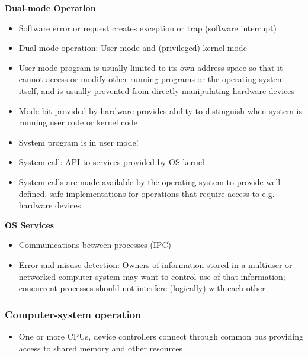 \documentclass[a4paper]{article}
\begin{document}
\textbf{Dual-mode Operation}
\begin{itemize}
	\item Software error or request creates exception or trap (software interrupt)
	\item Dual-mode operation: User mode and (privileged) kernel mode
	\item User-mode program is usually limited to its own address space so that it cannot access or modify other running programs or the operating system itself, and is usually prevented from directly manipulating hardware devices
	\item Mode bit provided by hardware provides ability to distinguish when system is running user code or kernel code
	\item System program is in user mode!
	\item System call: API to services provided by OS kernel
	\item System calls are made available by the operating system to provide well-defined, safe implementations for operations that require access to e.g. hardware devices
\end{itemize}
\newpage
\noindent \textbf{OS Services}
\begin{itemize}
	\item Communications between processes (IPC)
	\item Error and misuse detection: Owners of information stored in a multiuser or networked computer system may want to control use of that information; concurrent processes should not interfere (logically) with each other
\end{itemize}
\subsubsection{Computer-system operation}
\begin{itemize}
	\item One or more CPUs, device controllers connect through common bus providing access to shared memory and other resources
\end{itemize}
\end{document}
